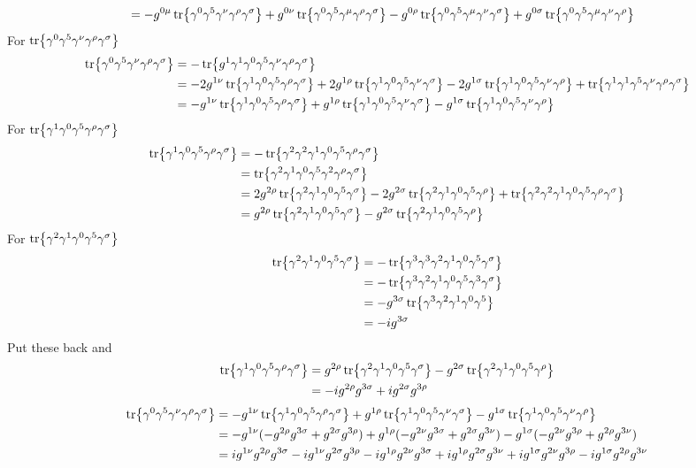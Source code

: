 \documentclass{article}
\newcommand{\gm}{\gamma^{\mu}}
\newcommand{\gn}{\gamma^{\nu}}
\newcommand{\gs}{\gamma^{\sigma}}
\newcommand{\gr}{\gamma^{\rho}}
\newcommand{\g}{\gamma}
\newcommand{\s}{\sigma}
\begin{document}
\begin{enumerate}[(i)]
\begin{align*}
    &=-g^{0\mu}\tr{\g^0\g^5\gn\gr\gs}+g^{0\nu}\tr{\g^0\g^5\gm\gr\gs}-g^{0\rho}\tr{\g^0\g^5\gm\gn\gs}+g^{0\s}\tr{\g^0\g^5\gm\gn\gr}
  \end{align*}
  For $\tr{\g^0\g^5\gn\gr\gs}$
  \begin{align*}
    \tr{\g^0\g^5\gn\gr\gs}&=-\tr{g^1\g^1\g^0\g^5\gn\gr\gs}\\
    &=-2g^{1\nu}\tr{\g^1\g^0\g^5\gr\gs}+2g^{1\rho}\tr{\g^1\g^0\g^5\gn\gs}-2g^{1\s}\tr{\g^1\g^0\g^5\gn\gr}+\tr{\g^1\g^1\g^5\gn\gr\gs}\\
    &=-g^{1\nu}\tr{\g^1\g^0\g^5\gr\gs}+g^{1\rho}\tr{\g^1\g^0\g^5\gn\gs}-g^{1\s}\tr{\g^1\g^0\g^5\gn\gr}
  \end{align*}
  For $\tr{\g^1\g^0\g^5\gr\gs}$
  \begin{align*}
    \tr{\g^1\g^0\g^5\gr\gs}&=-\tr{\g^2\g^2\g^1\g^0\g^5\gr\gs}\\
    &=\tr{\g^2\g^1\g^0\g^5\g^2\gr\gs}\\
    &=2g^{2\rho}\tr{\g^2\g^1\g^0\g^5\gs}-2g^{2\s}\tr{\g^2\g^1\g^0\g^5\gr}+\tr{\g^2\g^2\g^1\g^0\g^5\gr\gs}\\
    &=g^{2\rho}\tr{\g^2\g^1\g^0\g^5\gs}-g^{2\s}\tr{\g^2\g^1\g^0\g^5\gr}
  \end{align*}
  For $\tr{\g^2\g^1\g^0\g^5\gs}$
  \begin{align*}
    \tr{\g^2\g^1\g^0\g^5\gs}&=-\tr{\g^3\g^3\g^2\g^1\g^0\g^5\gs}\\
    &=-\tr{\g^3\g^2\g^1\g^0\g^5\g^3\gs}\\
    &=-g^{3\s}\tr{\g^3\g^2\g^1\g^0\g^5}\\
    &=-ig^{3\s}
  \end{align*}
  Put these back and
  \begin{align*}
    \tr{\g^1\g^0\g^5\gr\gs}&=g^{2\rho}\tr{\g^2\g^1\g^0\g^5\gs}-g^{2\s}\tr{\g^2\g^1\g^0\g^5\gr}\\
    &=-ig^{2\rho}g^{3\s}+ig^{2\s}g^{3\rho}
  \end{align*}
  \begin{align*}
    \tr{\g^0\g^5\gn\gr\gs}&=-g^{1\nu}\tr{\g^1\g^0\g^5\gr\gs}+g^{1\rho}\tr{\g^1\g^0\g^5\gn\gs}-g^{1\s}\tr{\g^1\g^0\g^5\gn\gr}\\
    &=-g^{1\nu}(-g^{2\rho}g^{3\s}+g^{2\s}g^{3\rho})+g^{1\rho}(-g^{2\nu}g^{3\s}+g^{2\s}g^{3\nu})-g^{1\s}(-g^{2\nu}g^{3\rho}+g^{2\rho}g^{3\nu})\\
    &=ig^{1\nu}g^{2\rho}g^{3\s}-ig^{1\nu}g^{2\s}g^{3\rho}-ig^{1\rho}g^{2\nu}g^{3\s}+ig^{1\rho}g^{2\s}g^{3\nu}+ig^{1\s}g^{2\nu}g^{3\rho}-ig^{1\s}g^{2\rho}g^{3\nu}
  \end{align*}

\end{enumerate}
\end{document}
